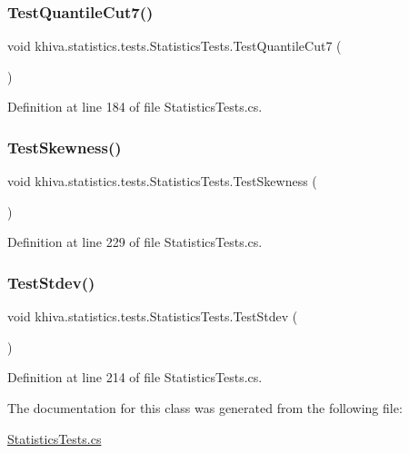 \subsubsection{\texorpdfstring{Test\+Quantile\+Cut7()}{TestQuantileCut7()}}
{\footnotesize\ttfamily void khiva.\+statistics.\+tests.\+Statistics\+Tests.\+Test\+Quantile\+Cut7 (\begin{DoxyParamCaption}{ }\end{DoxyParamCaption})\hspace{0.3cm}{\ttfamily [inline]}}



Definition at line 184 of file Statistics\+Tests.\+cs.

\mbox{\label{classkhiva_1_1statistics_1_1tests_1_1_statistics_tests_aaab247eb80f08e6f3a34316f3e927439}} 
\subsubsection{\texorpdfstring{Test\+Skewness()}{TestSkewness()}}
{\footnotesize\ttfamily void khiva.\+statistics.\+tests.\+Statistics\+Tests.\+Test\+Skewness (\begin{DoxyParamCaption}{ }\end{DoxyParamCaption})\hspace{0.3cm}{\ttfamily [inline]}}



Definition at line 229 of file Statistics\+Tests.\+cs.

\mbox{\label{classkhiva_1_1statistics_1_1tests_1_1_statistics_tests_aea520bbbe8023ed5a3eb8bb1a724a695}} 
\subsubsection{\texorpdfstring{Test\+Stdev()}{TestStdev()}}
{\footnotesize\ttfamily void khiva.\+statistics.\+tests.\+Statistics\+Tests.\+Test\+Stdev (\begin{DoxyParamCaption}{ }\end{DoxyParamCaption})\hspace{0.3cm}{\ttfamily [inline]}}



Definition at line 214 of file Statistics\+Tests.\+cs.



The documentation for this class was generated from the following file\+:\begin{DoxyCompactItemize}
\item 
\mbox{\hyperlink{_statistics_tests_8cs}{Statistics\+Tests.\+cs}}\end{DoxyCompactItemize}
